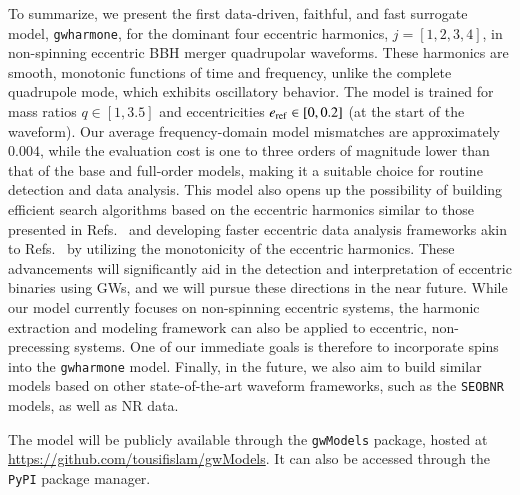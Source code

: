 \documentclass[aps,prd,amsmath,floats,floatfix, twocolumn,
superscriptaddress,nofootinbib,showpacs,longbibliography]{revtex4-1}
\begin{document}
To summarize, we present the first data-driven, faithful, and fast surrogate model, \texttt{gwharmone}, for the dominant four eccentric harmonics, $j=[1,2,3,4]$, in non-spinning eccentric BBH merger quadrupolar waveforms. These harmonics are smooth, monotonic functions of time and frequency, unlike the complete quadrupole mode, which exhibits oscillatory behavior. The model is trained for mass ratios $q \in [1,3.5]$ and eccentricities $e_{\rm ref} \in [0,0.2]$ (at the start of the waveform). Our average frequency-domain model mismatches are approximately $0.004$, while the evaluation cost is one to three orders of magnitude lower than that of the base and full-order models, making it a suitable choice for routine detection and data analysis. This model also opens up the possibility of building efficient search algorithms based on the eccentric harmonics similar to those presented in Refs.~\cite{Wadekar:2024zdq} and developing faster eccentric data analysis frameworks akin to Refs.~\cite{Zackay:2018qdy, Roulet:2024hwz} by utilizing the monotonicity of the eccentric harmonics. These advancements will significantly aid in the detection and interpretation of eccentric binaries using GWs, and we will pursue these directions in the near future. While our model currently focuses on non-spinning eccentric systems, the harmonic extraction and modeling framework can also be applied to eccentric, non-precessing systems. One of our immediate goals is therefore to incorporate spins into the \texttt{gwharmone} model. Finally, in the future, we also aim to build similar models based on other state-of-the-art waveform frameworks, such as the \texttt{SEOBNR} models, as well as NR data.

The model will be publicly available through the \texttt{gwModels} package, hosted at \href{https://github.com/tousifislam/gwModels}{https://github.com/tousifislam/gwModels}. It can also be accessed through the \texttt{PyPI} package manager.
\end{document}
